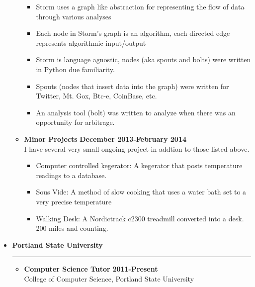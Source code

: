 \documentclass[overlapped]{res}
\begin{document}
\begin{resume}
\begin{itemize}[leftmargin=0in]
\begin{itemize}[leftmargin=0in]
\begin{samepage}
\begin{itemize}
                        \item[\textbullet] Storm uses a graph like abstraction for representing the flow of data through various analyses
                        \item[\textbullet] Each node in Storm's graph is an algorithm, each directed edge represents algorithmic input/output
                        \item[\textbullet] Storm is language agnostic,  nodes (aka spouts and bolts) were written in Python due familiarity.
                        \item[\textbullet] Spouts (nodes that insert data into the graph) were written for Twitter, Mt. Gox, Btc-e, CoinBase, etc.
                        \item[\textbullet] An analysis tool (bolt) was written to analyze when there was an opportunity for arbitrage.
                    \end{itemize}
                \end{samepage}
            \item[] 
                \begin{samepage}
                    \textbf{Minor Projects} \hfill \textbf{December 2013-February 2014} \\
                    I have several very small ongoing project in addtion to those listed above.
                    \begin{itemize}
                        \item[\textbullet] Computer controlled kegerator:  A kegerator that posts temperature readings to a database.
                        \item[\textbullet] Sous Vide:  A method of slow cooking that uses a water bath set to a very precise temperature
                        \item[\textbullet] Walking Desk:  A Nordictrack c2300 treadmill converted into a desk.  200 miles and counting.
                    \end{itemize}
                \end{samepage}
        \end{itemize}
\end{itemize}

\begin{itemize}[leftmargin=0in]
    \item[] \textbf{Portland State University} \\[-0.1in] \rule{\textwidth}{0.5pt}
        \begin{itemize}[leftmargin=0in]
            \item[] 
                \begin{samepage}
                    \textbf{Computer Science Tutor} \hfill \textbf{2011-Present} \\
                    College of Computer Science, Portland State University \hfill


\end{samepage}
\end{itemize}
\end{itemize}
\end{resume}
\end{document}
